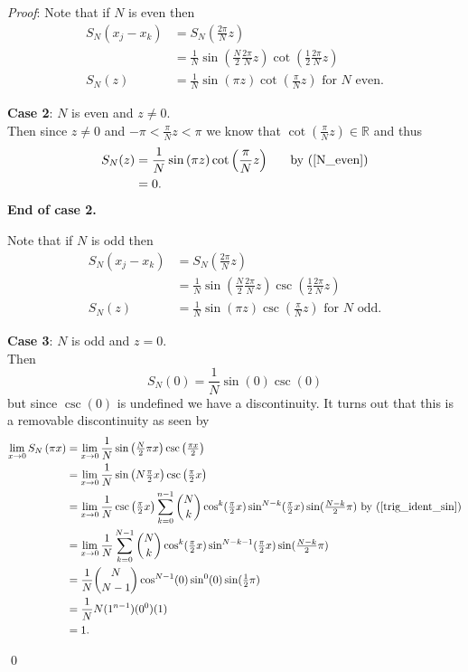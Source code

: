 \documentclass[12pt]{article}
\renewenvironment{proof}{\hspace{-4 ex} \emph{Proof}:}{\qed}
\newcommand{\RR}{\mathbb{R}}
\begin{document}
\begin{proof}
	Note that if $N$ is even then
	\begin{align}
	S_N(x_j - x_k) &= S_N\left( \frac{2\pi}{N}z \right) \nonumber \\
	&= \frac{1}{N} \sin \left(\frac{N}{2}\frac{2\pi}{N}z \right) \cot \left( \frac{1}{2}\frac{2\pi}{N}z \right) \nonumber \\
	S_N(z) &= \frac{1}{N} \sin \left(\pi z \right) \cot \left( \frac{\pi}{N}z \right) \label{N_even} \text{ for }N \text{ even.}
	\end{align}
	
	\textbf{Case 2}: $N$ is even and $z \neq 0$. \\
	Then since $z \neq 0$ and $-\pi < \frac{\pi}{N}z < \pi$ we know that $\cot(\tfrac{\pi}{N}z) \in \RR$ and thus
	\begin{align*}
		S_N(z) &= \frac{1}{N} \sin \left(\pi z \right) \cot \left( \frac{\pi}{N}z \right) \text{\ \ \ \ \ by (\ref{N_even})}\\
		&= 0 \text{.}
	\end{align*}
	\textbf{End of case 2.}
	\bigbreak
	
	Note that if $N$ is odd then
	\begin{align}
	S_N(x_j - x_k) &= S_N\left( \frac{2\pi}{N}z \right) \nonumber \\
	&= \frac{1}{N} \sin \left(\frac{N}{2}\frac{2\pi}{N}z \right) \csc \left( \frac{1}{2}\frac{2\pi}{N}z \right) \nonumber \\
	S_N(z) &= \frac{1}{N} \sin \left(\pi z \right) \csc \left( \frac{\pi}{N}z \right) \label{N_odd} \text{ for }N \text{ odd.}
	\end{align}
	\bigbreak
	
	\textbf{Case 3}: $N$ is odd and $z=0$. \\
	Then
	$$
	S_N(0) = \frac{1}{N} \sin \left(0 \right) \csc \left( 0 \right)
	$$
	but since $\csc(0)$ is undefined we have a discontinuity. It turns out that this is a removable discontinuity as seen by
	\begin{align*}
		\lim_{x \to 0}S_N \left( \pi x \right) &= \lim_{x \to 0} \frac{1}{N} \sin \left( \tfrac{N}{2} \pi x \right) \csc \left( \tfrac{\pi x}{2} \right) \\
		&= \lim_{x \to 0} \frac{1}{N} \sin \left(N \tfrac{\pi}{2}x \right) \csc \left( \tfrac{\pi}{2}x \right) \\
		&= \lim_{x \to 0} \frac{1}{N}  \csc \left( \tfrac{\pi}{2}x \right) \sum_{k=0}^{n-1} {N \choose k} \cos^k(\tfrac{\pi}{2}x) \sin^{N-k}(\tfrac{\pi}{2}x) \sin(\tfrac{N-k}{2}\pi) \text{ by }(\ref{trig_ident_sin})\\
		&= \lim_{x \to 0} \frac{1}{N} \sum_{k=0}^{N-1} {N \choose k} \cos^{k}(\tfrac{\pi}{2}x) \sin^{N-k-1}(\tfrac{\pi}{2}x) \sin(\tfrac{N-k}{2}\pi) \\
		&= \frac{1}{N} {N \choose N-1} \cos^{N-1}(0)\sin^{0}(0) \sin(\tfrac{1}{2}\pi) \\
		&= \frac{1}{N} N (1^{n-1})(0^0)(1) \\
		&= 1 \text{.}
	\end{align*}
	

\end{proof}
\end{document}
